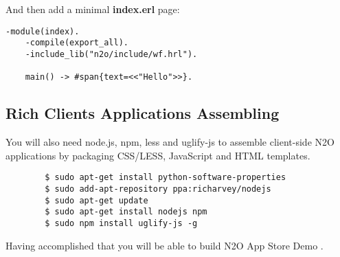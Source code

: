 And then add a minimal {\bf index.erl} page:

\begin{lstlisting}[caption=index.erl]
    -module(index).
    -compile(export_all).
    -include_lib("n2o/include/wf.hrl").

    main() -> #span{text=<<"Hello">>}.
\end{lstlisting}

\subsection{Rich Clients Applications Assembling}
You will also need node.js, npm, less and uglify-js to assemble
client-side N2O applications by packaging CSS/LESS, JavaScript and HTML templates.

\vspace{1\baselineskip}
\begin{lstlisting}
        $ sudo apt-get install python-software-properties
        $ sudo add-apt-repository ppa:richarvey/nodejs
        $ sudo apt-get update
        $ sudo apt-get install nodejs npm
        $ sudo npm install uglify-js -g
\end{lstlisting}
\vspace{1\baselineskip}

Having accomplished that you will be able to build N2O App Store
Demo \newline{}.
